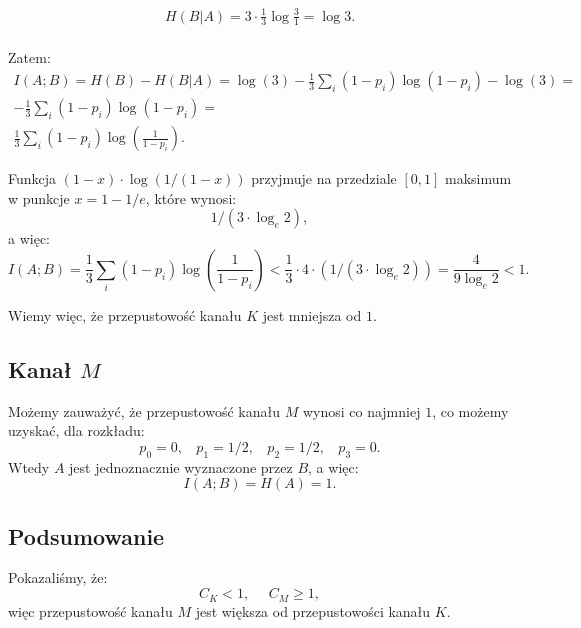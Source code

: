 \begin{multline*}
	H(B | A) = 3 \cdot \frac{1}{3} \log{\frac{3}{1}} = \log{3}. \\
\end{multline*}

Zatem:
\begin{multline*}
	I(A; B) = H(B) - H(B | A) = \log(3) - \frac{1}{3}\sum_{i} (1-p_{i})\log(1-p_{i}) - \log(3) = \\
	- \frac{1}{3}\sum_{i} (1-p_{i})\log(1-p_{i}) = \\
	\frac{1}{3}\sum_{i} (1-p_{i})\log\left(\frac{1}{1-p_{i}}\right).
\end{multline*}

Funkcja $(1-x)\cdot \log(1/(1-x))$ przyjmuje na przedziale $[0, 1]$ maksimum w punkcje $x = 1 - 1/e$, które wynosi:
$$
	1 / (3 \cdot \log_e 2),
$$
a więc:
$$
	I(A; B) =
	\frac{1}{3}\sum_{i} (1-p_{i})\log\left(\frac{1}{1-p_{i}}\right) <
	\frac{1}{3} \cdot 4 \cdot (1 / (3 \cdot \log_e 2)) =
	\frac{4}{9\log_e 2} < 1.
$$

Wiemy więc, że przepustowość kanału $K$ jest mniejsza od $1$.

\subsection*{Kanał $M$}

Możemy zauważyć, że przepustowość kanału $M$ wynosi co najmniej $1$, co możemy uzyskać, dla rozkładu:
$$
p_0 = 0, \ \  \ \ 
p_1 = 1/2, \ \  \ \ 
p_2 = 1/2, \ \  \ \ 
p_3 = 0.
$$
Wtedy $A$ jest jednoznacznie wyznaczone przez $B$, a więc:
$$
	I(A; B) = H(A) = 1.
$$

\subsection*{Podsumowanie}

Pokazaliśmy, że:
$$
	C_K < 1, \ \ \ \ \ \ C_M \geq 1,
$$
więc przepustowość kanału $M$ jest większa od przepustowości kanału $K$.

